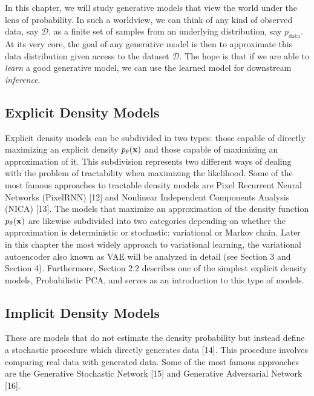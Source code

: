 In this chapter, we will study generative models that view the world under the lens of probability.
In such a worldview, we can think of any kind of
observed data, say $\mathcal{D}$, as a finite set of samples from an
underlying distribution, say $p_{\mathrm{data}}$. At its very core, the
goal of any generative model is then to approximate this data
distribution given access to the dataset $\mathcal{D}$. The hope is that
if we are able to {\em learn} a good generative model, we can use the
learned model for downstream {\em inference}.


\subsection{Explicit Density Models}

Explicit density models can be subdivided in two types: those capable of directly 
maximizing an explicit density $p_\theta(\mathbf{x})$ and those capable of maximizing an 
approximation of it. This subdivision represents two different ways of dealing with 
the problem of tractability when maximizing the likelihood. Some of the most famous 
approaches to tractable density models are Pixel Recurrent Neural Networks 
(PixelRNN) [12] and Nonlinear Independent Components Analysis (NICA) [13].
The models that maximize an approximation of the density function $p_\theta(\mathbf{x})$ 
are likewise subdivided into two categories depending on whether the approximation 
is deterministic or stochastic: variational or Markov chain. Later in this chapter 
the most widely approach to variational learning, the variational autoencoder also 
known as VAE will be analyzed in detail (see Section 3 and Section 4).
Furthermore, Section 2.2 describes one of the simplest explicit density models, 
Probabilistic PCA, and serves as an introduction to this type of models.


\subsection{Implicit Density Models}

These are models that do not estimate the density probability but instead define a 
stochastic procedure which directly generates data [14]. This procedure involves 
comparing real data with generated data. Some of the most famous approaches are 
the Generative Stochastic Network [15] and Generative Adversarial Network [16].


